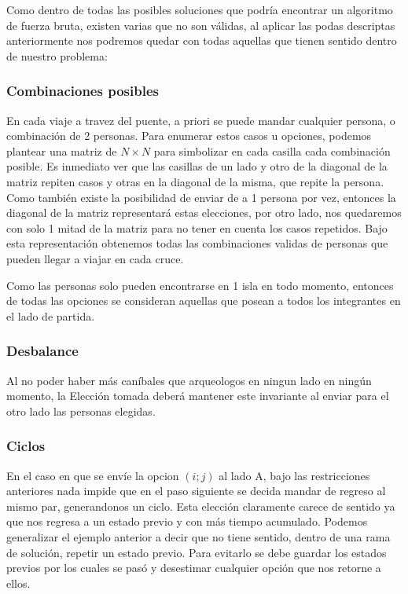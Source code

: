 Como dentro de todas las posibles soluciones que podría encontrar un algoritmo de fuerza bruta, existen varias que no son válidas, al aplicar las podas descriptas anteriormente nos podremos quedar con todas aquellas que tienen sentido dentro de nuestro problema:


\subsubsection*{Combinaciones posibles}
En cada viaje a travez del puente, a priori se puede mandar cualquier persona, o combinación de 2 personas. Para enumerar estos casos u opciones, podemos plantear una matriz de $N \times N$ para simbolizar en cada casilla cada combinación posible. Es inmediato ver que las casillas de un lado y otro de la diagonal de la matriz repiten casos y otras en la diagonal de la misma, que repite la persona. Como también existe la posibilidad de enviar de a 1 persona por vez, entonces la diagonal de la matriz representará estas elecciones, por otro lado, nos quedaremos con solo 1 mitad de la matriz para no tener en cuenta los casos repetidos. Bajo esta representación obtenemos todas las combinaciones validas de personas que pueden llegar a viajar en cada cruce.

Como las personas solo pueden encontrarse en 1 isla en todo momento, entonces de todas las opciones se consideran aquellas que posean a todos los integrantes en el lado de partida.

\subsubsection*{Desbalance}
Al no poder haber más caníbales que arqueologos en ningun lado en ningún momento, la Elección tomada deberá mantener este invariante al enviar para el otro lado las personas elegidas.

\subsubsection*{Ciclos}
En el caso en que se envíe la opcion $(i; j)$ al lado A, bajo las restricciones anteriores nada impide que en el paso siguiente se decida mandar de regreso al mismo par, generandonos un ciclo. Esta elección claramente carece de sentido ya que nos regresa a un estado previo y con más tiempo acumulado. Podemos generalizar el ejemplo anterior a decir que no tiene sentido, dentro de una rama de solución, repetir un estado previo. Para evitarlo se debe guardar los estados previos por los cuales se pasó y desestimar cualquier opción que nos retorne a ellos.

